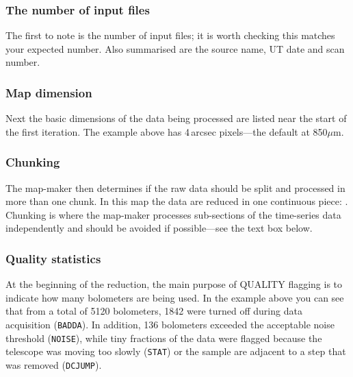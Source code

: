 \documentclass[11pt,oneside,chapters]{starlink}
\begin{document}

\subsubsection*{The number of input files}%
The first to note is the number of input files; it is worth checking
this matches your expected number. Also summarised are the source
name, UT date and scan number.

\subsubsection*{Map dimension}
Next the basic dimensions of the data being processed are listed near
the start of the first iteration. The example above has 4\,arcsec
pixels---the default at 850$\mu$m.

\subsubsection{Chunking}%
The map-maker then determines if the raw data should be split and
processed in more than one chunk. In this map the data are reduced in
one continuous piece: . Chunking is
where the map-maker processes sub-sections of the time-series data
independently and should be avoided if possible---see the text box
below.


\subsubsection{Quality statistics}%

At the beginning of the reduction, the main purpose of QUALITY
flagging is to indicate how many bolometers are being used. In the
example above you can see that from a total of 5120 bolometers, 1842
were turned off during data acquisition (\texttt{BADDA}). In addition,
136 bolometers
exceeded the acceptable noise threshold (\texttt{NOISE}), while tiny
fractions of the data were flagged because the telescope was moving
too slowly (\texttt{STAT}) or the sample are adjacent to a step that
was removed (\texttt{DCJUMP}).
\end{document}
